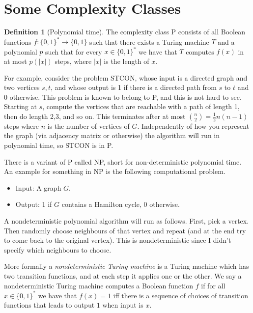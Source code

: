 \documentclass{report}
\theoremstyle{definition}
\theoremstyle{plain}
\theoremstyle{definition}
\newtheorem{defn}[thm]{Definition}
\begin{document}
	\section{Some Complexity Classes}
	\begin{defn}[Polynomial time]
		The complexity class P consists of all Boolean functions $f\colon \{0,1\}^*\to\{0,1\}$ such that there exists a Turing machine $T$ and a polynomial $p$ such that for every $x\in \{0,1\}^*$ we have that $T$ computes $f(x)$ in at most $p(|x|)$ steps, where $|x|$ is the length of $x$.
	\end{defn}
	For example, consider the problem STCON, whose input is a directed graph and two vertices $s,t$, and whose output is 1 if there is a directed path from $s$ to $t$ and 0 otherwise. This problem is known to belong to P, and this is not hard to see. Starting at $s$, compute the vertices that are reachable with a path of length 1, then do length 2,3, and so on. This terminates after at most $\binom{n}{2} = \frac{1}{2}n(n-1)$ steps where $n$ is the number of vertices of $G$. Independently of how you represent the graph (via adjacency matrix or otherwise) the algorithm will run in polynomial time, so STCON is in P.	
	
	There is a variant of P called NP, short for non-deterministic polynomial time. An example for something in NP is the following computational problem.
	\begin{itemize}
		\item Input: A graph $G$.
		\item Output: 1 if $G$ contains a Hamilton cycle, 0 otherwise.
	\end{itemize}
	A nondeterministic polynomial algorithm will run as follows. First, pick a vertex. Then randomly choose neighbours of that vertex and repeat (and at the end try to come back to the original vertex). This is nondeterministic since I didn't specify which neighbours to choose.
	
	More formally a \emph{nondeterministic Turing machine} is a Turing machine which has two transition functions, and at each step it applies one or the other. We say a nondeterministic Turing machine computes a Boolean function $f$ if for all $x\in\{0,1\}^*$ we have that $f(x) = 1$ iff there is a sequence of choices of transition functions that leads to output $1$ when input is $x$. 
	
\end{document}
